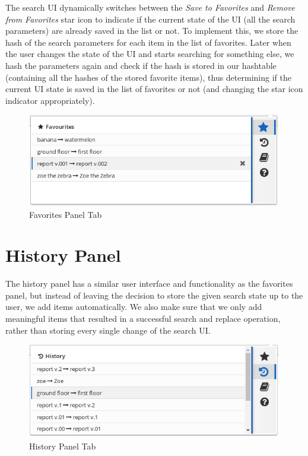 \documentclass[bsc,frontabs,twoside,singlespacing,parskip,deptreport]{infthesis}
\begin{document}
The search UI dynamically switches between the \textit{Save to Favorites} and \textit{Remove from Favorites} star icon to indicate if the current state of the UI (all the search parameters) are already saved in the list or not. To implement this, we store the hash of the search parameters for each item in the list of favorites. Later when the user changes the state of the UI and starts searching for something else, we hash the parameters again and check if the hash is stored in our hashtable (containing all the hashes of the stored favorite items), thus determining if the current UI state is saved in the list of favorites or not (and changing the star icon indicator appropriately).

\begin{figure}[h]
\centering
\includegraphics[width=0.99\textwidth]{../main/images/help/fav-step-3.png}
\caption{Favorites Panel Tab}
\end{figure}

\section{History Panel}
The history panel has a similar user interface and functionality as the favorites panel, but instead of leaving the decision to store the given search state up to the user, we add items automatically. We also make sure that we only add meaningful items that resulted in a successful search and replace operation, rather than storing every single change of the search UI.

\begin{figure}[h]
\centering
\includegraphics[width=0.99\textwidth]{../main/images/help/history.png}
\caption{History Panel Tab}
\end{figure}
\end{document}
